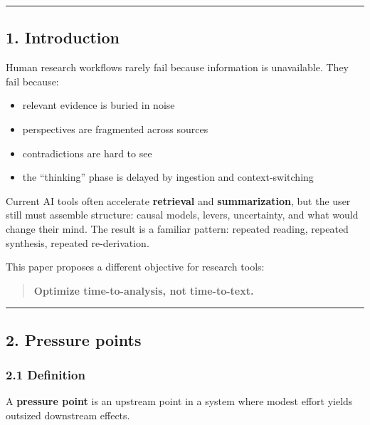 \documentclass[11pt]{article}
\providecommand{\tightlist}{%
  \setlength{\itemsep}{0pt}\setlength{\parskip}{0pt}}
\begin{document}
\begin{center}\rule{0.5\linewidth}{0.5pt}\end{center}

\hypertarget{introduction}{%
\subsection{1. Introduction}\label{introduction}}

Human research workflows rarely fail because information is unavailable.
They fail because:

\begin{itemize}
\tightlist
\item
  relevant evidence is buried in noise
\item
  perspectives are fragmented across sources
\item
  contradictions are hard to see
\item
  the ``thinking'' phase is delayed by ingestion and context-switching
\end{itemize}

Current AI tools often accelerate \textbf{retrieval} and
\textbf{summarization}, but the user still must assemble structure:
causal models, levers, uncertainty, and what would change their mind.
The result is a familiar pattern: repeated reading, repeated synthesis,
repeated re-derivation.

This paper proposes a different objective for research tools:

\begin{quote}
\textbf{Optimize time-to-analysis, not time-to-text.}
\end{quote}

\begin{center}\rule{0.5\linewidth}{0.5pt}\end{center}

\hypertarget{pressure-points}{%
\subsection{2. Pressure points}\label{pressure-points}}

\hypertarget{definition}{%
\subsubsection{2.1 Definition}\label{definition}}

A \textbf{pressure point} is an upstream point in a system where modest
effort yields outsized downstream effects.
\end{document}
